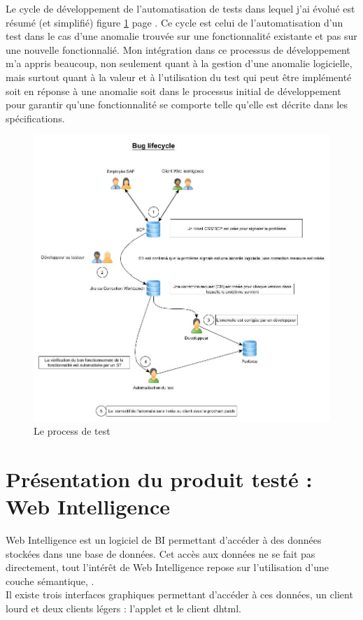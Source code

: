 Le cycle de d\'{e}veloppement de l'automatisation de tests dans lequel j'ai \'{e}volu\'{e} est r\'{e}sum\'{e} (et simplifi\'{e}) figure \ref{figure:testProcess} page \pageref{figure:testProcess}. Ce cycle est celui de l'automatisation d'un test dans le cas d'une anomalie trouv\'{e}e sur une fonctionnalit\'{e} existante et pas sur une nouvelle fonctionnali\'{e}. Mon int\'{e}gration dans ce processus de d\'{e}veloppement m'a appris beaucoup, non seulement quant \`{a} la gestion d'une anomalie logicielle, mais surtout quant \`{a} la valeur et \`{a} l'utilisation du test qui peut \^{e}tre impl\'{e}menté soit en r\'{e}ponse \`{a} une anomalie soit dans le processus initial de d\'{e}veloppement pour garantir qu'une fonctionnalit\'{e} se comporte telle qu'elle est d\'{e}crite dans les sp\'{e}cifications.\\
\begin{figure}[!ht]
  \centering
      \includegraphics[width=\textwidth]{images/testProcessAtSAP.jpg}
  \caption{Le process de test}
	\label{figure:testProcess}
\end{figure}
 


\section{Pr\'{e}sentation du produit test\'{e} : Web Intelligence}
Web Intelligence est un logiciel de BI permettant d'acc\'{e}der \`{a} des donn\'{e}es stock\'{e}es dans une base de donn\'{e}es. Cet acc\`{e}s aux donn\'{e}es ne se fait pas directement, tout l'int\'{e}r\^{e}t de Web Intelligence repose sur l'utilisation d'une couche s\'{e}mantique, .\\
Il existe trois interfaces graphiques permettant d'acc\'{e}der \`{a} ces donn\'{e}es, un client lourd et deux clients l\'{e}gers : l'applet et le client dhtml.



